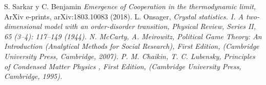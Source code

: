 \documentclass[portrait, a0b,final]{a0poster}%
\numberwithin{equation}{section}
\newenvironment{poster}{
  \begin{center}
  \begin{minipage}[c]{0.98\textwidth}
}{
  \end{minipage}
  \end{center}
}
\newenvironment{pcolumn}[1]{
  \begin{minipage}{#1\textwidth}
  \begin{center}
}{
  \end{center}
  \end{minipage}
}
\begin{document}
\begin{poster}
\begin{center}
\begin{pcolumn}{0.32}
{%



S. Sarkar y C. Benjamin {\it Emergence of Cooperation in the thermodynamic limit,} ArXiv e-prints, arXiv:1803.10083 (2018).
L. Onsager, \it{Crystal statistics. I. A two-dimensional model with an order-disorder transition}, Physical Review, Series II, 65 (3–4): 117–149 (1944).
N. McCarty, A. Meirowitz, {\it Political Game Theory: An Introduction (Analytical Methods for Social Research),} First Edition, (Cambridge University Press, Cambridge, 2007).
P. M. Chaikin,  T. C. Lubensky, {\it Principles of Condensed Matter Physics
,} First Edition, (Cambridge University Press, Cambridge, 1995).
}
\end{pcolumn}
\end{center}




\end{poster}
\end{document}
